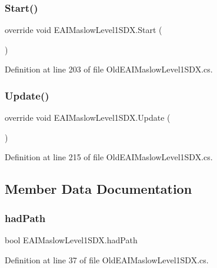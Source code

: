 \subsubsection{\texorpdfstring{Start()}{Start()}}
{\footnotesize\ttfamily override void E\+A\+I\+Maslow\+Level1\+S\+D\+X.\+Start (\begin{DoxyParamCaption}{ }\end{DoxyParamCaption})}



Definition at line 203 of file Old\+E\+A\+I\+Maslow\+Level1\+S\+D\+X.\+cs.

\mbox{\label{class_e_a_i_maslow_level1_s_d_x_ab42d824589397c9e9924975b62fe2a6d}} 
\subsubsection{\texorpdfstring{Update()}{Update()}}
{\footnotesize\ttfamily override void E\+A\+I\+Maslow\+Level1\+S\+D\+X.\+Update (\begin{DoxyParamCaption}{ }\end{DoxyParamCaption})}



Definition at line 215 of file Old\+E\+A\+I\+Maslow\+Level1\+S\+D\+X.\+cs.



\subsection{Member Data Documentation}
\mbox{\label{class_e_a_i_maslow_level1_s_d_x_ad02259fefd140ce3cf568a0d72200da8}} 
\subsubsection{\texorpdfstring{hadPath}{hadPath}}
{\footnotesize\ttfamily bool E\+A\+I\+Maslow\+Level1\+S\+D\+X.\+had\+Path}



Definition at line 37 of file Old\+E\+A\+I\+Maslow\+Level1\+S\+D\+X.\+cs.

\mbox{\label{class_e_a_i_maslow_level1_s_d_x_a1bc5caa9abb4e218b819188f2909e9c8}} 
